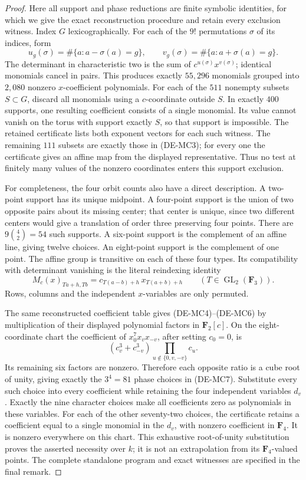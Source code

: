 \begin{proof}
Here all support and phase reductions are finite symbolic identities,
for which we give the exact reconstruction procedure and retain
every exclusion witness.  Index \(G\) lexicographically.  For each
of the \(9!\) permutations \(\sigma\) of its indices, form
\[
 u_g(\sigma)=\#\{a:a-\sigma(a)=g\},\qquad
 v_g(\sigma)=\#\{a:a+\sigma(a)=g\}.
\]
The determinant in characteristic two is the sum of
\(c^{u(\sigma)}x^{v(\sigma)}\); identical monomials cancel in pairs.
This produces exactly \(55{,}296\) monomials grouped into
\(2{,}080\) nonzero \(x\)-coefficient polynomials.
For each of the \(511\) nonempty subsets \(S\subset G\), discard
all monomials using a \(c\)-coordinate outside \(S\).  In exactly
\(400\) supports, one resulting coefficient consists of a single
monomial.  Its value cannot vanish on the torus with support exactly
\(S\), so that support is impossible.  The retained certificate
lists both exponent vectors for each such witness.  The remaining
\(111\) subsets are exactly those in (DE-MC3); for every one the
certificate gives an affine map from the displayed representative.
Thus no test at finitely many values of the nonzero coordinates
enters this support exclusion.

For completeness, the four orbit counts also have a direct
description.  A two-point support has its unique midpoint.  A
four-point support is the union of two opposite pairs about its
missing center; that center is unique, since two different centers
would give a translation of order three preserving four points.
There are \(9\binom42=54\) such supports.  A six-point support is
the complement of an affine line, giving twelve choices.  An
eight-point support is the complement of one point.  The affine
group is transitive on each of these four types.  Its compatibility
with determinant vanishing is the literal reindexing identity
\[
 M_c(x)_{Ta+h,Tb}=c_{T(a-b)+h}\,x_{T(a+b)+h}
 \qquad(T\in\operatorname{GL}_2(\mathbf F_3)).                   \tag{DE-MC8}
\]
Rows, columns and the independent \(x\)-variables are only
permuted.

The same reconstructed coefficient table gives (DE-MC4)--(DE-MC6)
by multiplication of their displayed polynomial factors in
\(\mathbf F_2[c]\).  On the eight-coordinate chart the coefficient
of \(x_0^7x_vx_{-v}\), after setting \(c_0=0\), is
\[
 (c_v^3+c_{-v}^3)\prod_{u\notin\{0,v,-v\}}c_u.                 \tag{DE-MC9}
\]
Its remaining six factors are nonzero.  Therefore each opposite
ratio is a cube root of unity, giving exactly the \(3^4=81\)
phase choices in (DE-MC7).  Substitute every such choice into
every coefficient while retaining the four independent variables
\(d_v\).  Exactly the nine character choices make all coefficients
zero as polynomials in these variables.  For each of the other
seventy-two choices, the certificate retains a coefficient equal
to a single monomial in the \(d_v\), with nonzero coefficient in
\(\mathbf F_4\).  It is nonzero everywhere on this chart.
This exhaustive root-of-unity substitution proves the asserted
necessity over \(k\); it is not an extrapolation from its
\(\mathbf F_4\)-valued points.  The complete standalone program
and exact witnesses are specified in the final remark.
\end{proof}

